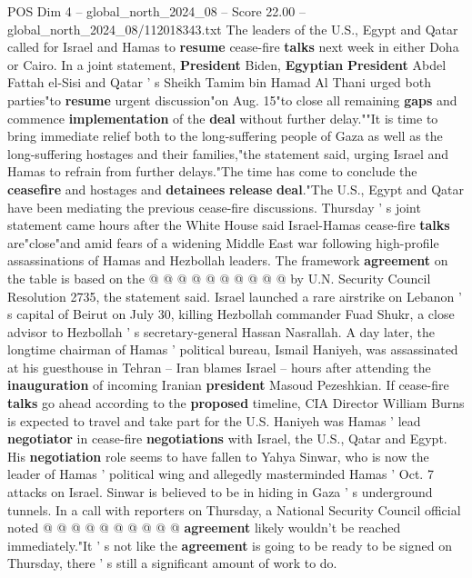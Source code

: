 \begin{textsample}{POS Dim 4 – global\_north\_2024\_08 – Score 22.00 – global\_north\_2024\_08/112018343.txt}  \label{ex:f4_pos_168}
The leaders of the U.S., Egypt and Qatar called for Israel and Hamas to \textbf{resume} cease-fire \textbf{talks} next week in either Doha or Cairo.
In a joint statement, \textbf{President} Biden, \textbf{Egyptian} \textbf{President} Abdel Fattah el-Sisi and Qatar ' s Sheikh Tamim bin Hamad Al Thani urged both parties"to \textbf{resume} urgent discussion"on Aug. 15"to close all remaining \textbf{gaps} and commence \textbf{implementation} of the \textbf{deal} without further delay.""It is time to bring immediate relief both to the long-suffering people of Gaza as well as the long-suffering hostages and their families,"the statement said, urging Israel and Hamas to refrain from further delays."The time has come to conclude the \textbf{ceasefire} and hostages and \textbf{detainees} \textbf{release} \textbf{deal}."The U.S., Egypt and Qatar have been mediating the previous cease-fire discussions.
Thursday ' s joint statement came hours after the White House said Israel-Hamas cease-fire \textbf{talks} are"close"and amid fears of a widening Middle East war following high-profile assassinations of Hamas and Hezbollah leaders.
The framework \textbf{agreement} on the table is based on the @ @ @ @ @ @ @ @ @ @ by U.N.
Security Council Resolution 2735, the statement said.
Israel launched a rare airstrike on Lebanon ' s capital of Beirut on July 30, killing Hezbollah commander Fuad Shukr, a close advisor to Hezbollah ' s secretary-general Hassan Nasrallah.
A day later, the longtime chairman of Hamas ' political bureau, Ismail Haniyeh, was assassinated at his guesthouse in Tehran -- Iran blames Israel -- hours after attending the \textbf{inauguration} of incoming Iranian \textbf{president} Masoud Pezeshkian.
If cease-fire \textbf{talks} go ahead according to the \textbf{proposed} timeline, CIA Director William Burns is expected to travel and take part for the U.S.
Haniyeh was Hamas ' lead \textbf{negotiator} in cease-fire \textbf{negotiations} with Israel, the U.S., Qatar and Egypt.
His \textbf{negotiation} role seems to have fallen to Yahya Sinwar, who is now the leader of Hamas ' political wing and allegedly masterminded Hamas ' Oct. 7 attacks on Israel.
Sinwar is believed to be in hiding in Gaza ' s underground tunnels.
In a call with reporters on Thursday, a National Security Council official noted @ @ @ @ @ @ @ @ @ @ \textbf{agreement} likely wouldn't be reached immediately."It ' s not like the \textbf{agreement} is going to be ready to be signed on Thursday, there ' s still a significant amount of work to do.

\end{textsample}
